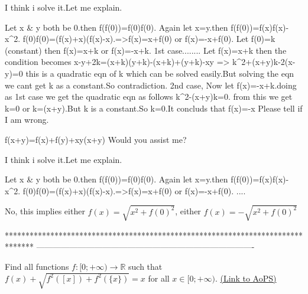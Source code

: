 \begin{solution}
	I think i solve it.Let me explain.

Let x & y both be 0.then f(f(0))=f(0)f(0).
Again let x=y.then f(f(0))=f(x)f(x)-x^2.
f(0)f(0)=(f(x)+x)(f(x)-x).=>f(x)=x+f(0) or f(x)=-x+f(0).
Let f(0)=k (constant) then f(x)=x+k or f(x)=-x+k.
1st case........
Let f(x)=x+k then the condition becomes
x-y+2k=(x+k)(y+k)-(x+k)+(y+k)-xy => k^2+(x+y)k-2(x-y)=0 this is a quadratic eqn of k which can be solved easily.But solving the eqn we cant get k as a constant.So contradiction.
2nd case,
Now let f(x)=-x+k.doing as 1st case we get the quadratic eqn as follows
k^2-(x+y)k=0.
from this we get k=0 or k=(x+y).But k is a constant.So k=0.It concluds that f(x)=-x
Please tell if I am wrong.
\end{solution}



\begin{solution}
	f(x+y)=f(x)+f(y)+xy(x+y) Would you assist me?
\end{solution}



\begin{solution}
	\begin{tcolorbox}I think i solve it.Let me explain.

Let x & y both be 0.then f(f(0))=f(0)f(0).
Again let x=y.then f(f(0))=f(x)f(x)-x^2.
f(0)f(0)=(f(x)+x)(f(x)-x).=>f(x)=x+f(0) or f(x)=-x+f(0).
....\end{tcolorbox}
No, this implies either $f(x)=\sqrt{x^2+f(0)^2}$, either $f(x)=-\sqrt{x^2+f(0)^2}$
\end{solution}
*******************************************************************************
-------------------------------------------------------------------------------

\begin{problem}
	Find all functions ${f: \mathbb[0;+\infty)}\to\mathbb{R}$ such that $f(x)+\sqrt{f^2([ x ])+f^2(\{ x\})}=x$ for all $x{\in}[0;+\infty)$.
	\flushright \href{https://artofproblemsolving.com/community/c6h573455}{(Link to AoPS)}
\end{problem}



